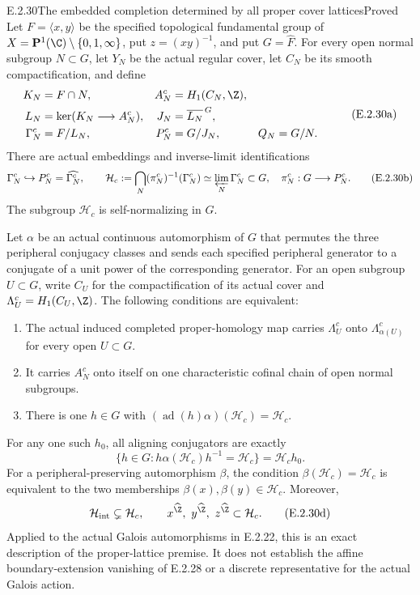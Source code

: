\begin{result}{E.2.30}{The embedded completion determined by all proper cover lattices}{Proved}
Let \(F=\langle x,y\rangle\) be the specified topological fundamental
group of \(X=\mathbf P^1(\C)\setminus\{0,1,\infty\}\), put
\(z=(xy)^{-1}\), and put \(G=\widehat F\). For every open normal
subgroup \(N\subset G\), let \(Y_N\) be the actual regular cover,
let \(C_N\) be its smooth compactification, and define
\[
\begin{aligned}
 K_N&=F\cap N,& A_N^c&=H_1(C_N,\Z),\\
 L_N&=\ker(K_N\longrightarrow A_N^c),&
 J_N&=\overline{L_N}^{\,G},\\
 \Gamma_N^c&=F/L_N,&P_N^c&=G/J_N,& Q_N&=G/N.
\end{aligned}
\tag{E.2.30a}
\]
There are actual embeddings and inverse-limit identifications
\[
 \Gamma_N^c\hookrightarrow P_N^c=\widehat{\Gamma_N^c},
 \qquad
 \mathcal H_c:=\bigcap_N(\pi_N^c)^{-1}(\Gamma_N^c)
       \simeq\varprojlim_N\Gamma_N^c\subset G,
 \quad \pi_N^c:G\longrightarrow P_N^c.
\tag{E.2.30b}
\]
The subgroup \(\mathcal H_c\) is self-normalizing in \(G\).

Let \(\alpha\) be an actual continuous automorphism of \(G\)
that permutes the three peripheral conjugacy classes and sends
each specified peripheral generator to a conjugate of a unit
power of the corresponding generator. For an open subgroup
\(U\subset G\), write \(C_U\) for the compactification of its
actual cover and \(\Lambda_U^c=H_1(C_U,\Z)\). The following
conditions are equivalent:
\begin{enumerate}
\item The actual induced completed proper-homology map carries
\(\Lambda_U^c\) onto \(\Lambda_{\alpha(U)}^c\) for every open
\(U\subset G\).
\item It carries \(A_N^c\) onto itself on one characteristic
cofinal chain of open normal subgroups.
\item There is one \(h\in G\) with
\((\operatorname{ad}(h)\alpha)(\mathcal H_c)=\mathcal H_c\).
\end{enumerate}
For any one such \(h_0\), all aligning conjugators are exactly
\[
 \{h\in G:h\alpha(\mathcal H_c)h^{-1}=\mathcal H_c\}
        =\mathcal H_c h_0.
\tag{E.2.30c}
\]
For a peripheral-preserving automorphism \(\beta\), the condition
\(\beta(\mathcal H_c)=\mathcal H_c\) is equivalent to the two
memberships \(\beta(x),\beta(y)\in\mathcal H_c\).
Moreover,
\[
 \mathcal H_{\mathrm{int}}\subsetneq\mathcal H_c,
 \qquad
 x^{\widehat\Z},\ y^{\widehat\Z},\ z^{\widehat\Z}
       \subset\mathcal H_c.
\tag{E.2.30d}
\]
Applied to the actual Galois automorphisms in E.2.22, this is
an exact description of the proper-lattice premise. It does
not establish the affine boundary-extension vanishing of
E.2.28 or a discrete representative for the actual Galois action.
\end{result}
